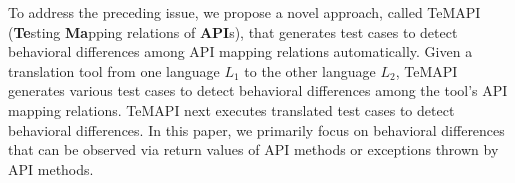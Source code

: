 %

To address the preceding issue, we propose a novel approach, called TeMAPI (\textbf{Te}sting \textbf{Ma}pping relations of \textbf{API}s), that generates test cases to detect behavioral differences among API mapping relations automatically. Given a translation tool from one language $L_1$ to the other language $L_2$, TeMAPI generates various test cases to detect behavioral differences among the tool's API mapping relations. TeMAPI next executes translated test cases to detect behavioral differences. In this paper, we primarily focus on behavioral differences that can be observed via return values of API methods or exceptions thrown by API methods.

